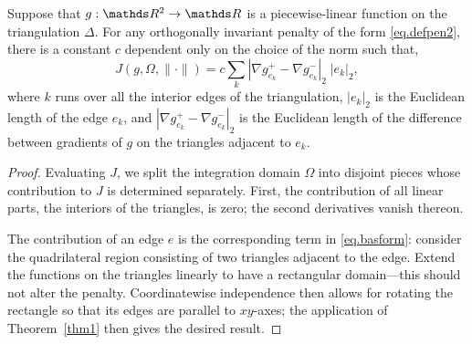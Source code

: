 \begin{thm}
\label{thm2}
Suppose that $g: \RR^2 \to \RR$
is a piecewise-linear function on the triangulation $\Delta$.
For any  orthogonally invariant penalty of the form \eqref{eq.defpen2}, there
is a constant $c$ dependent only on the choice of the norm such that,
\begin{equation}
\label{eq.basform}
J(g, \varOmega,\| \cdot \|) = 
c \sum_{k} | \nabla g^+_{e_k} - \nabla g^-_{e_k} |_2 \; | e_k |_2,
\end{equation}
where $k$ runs over all the interior edges of the triangulation,
$|e_k |_2$ is the Euclidean length of the edge $e_k $, and 
$| \nabla g^+_{e_k}  - \nabla g^-_{e_k}  |_2$ is the Euclidean length of the
difference between gradients of $g$ on the triangles adjacent to $e_k $.
\end{thm}
\begin{proof}
Evaluating $J$, we split the integration domain $\varOmega$ into
disjoint pieces whose contribution to $J$ is determined separately.
First, the contribution of all linear parts, the interiors of the
triangles, is zero; the second derivatives vanish thereon.
 
The contribution of an edge $e$ is the corresponding term in
\eqref{eq.basform}: consider the quadrilateral region consisting of two
triangles adjacent to the edge. Extend the functions on the triangles
linearly to have a rectangular domain---this should not alter the
penalty. Coordinatewise independence then allows for rotating the
rectangle so that its edges are parallel to $xy$-axes; the application
of Theorem~\ref{thm1} then gives the desired result.  


\end{proof}
